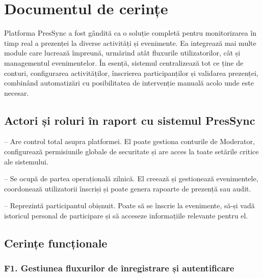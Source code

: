 \documentclass[a4paper,12pt,oneside]{report}
\begin{document}
\section{Documentul de cerințe}

Platforma PresSync a fost gândită ca o soluție completă pentru monitorizarea în timp real a prezenței la diverse activități și evenimente. Ea integrează mai multe module care lucrează împreună, urmărind atât fluxurile utilizatorilor, cât și managementul evenimentelor. În esență, sistemul centralizează tot ce ține de conturi, configurarea activităților, înscrierea participanților și validarea prezenței, combinând automatizări cu posibilitatea de intervenție manuală acolo unde este necesar.

\subsection{Actori și roluri în raport cu sistemul PresSync}

\begin{description}[leftmargin=1.5cm, style=nextline]
    \item[Admin] – Are control total asupra platformei. El poate gestiona conturile de Moderator, configurează permisiunile globale de securitate și are acces la toate setările critice ale sistemului.
    
    \item[Moderator] – Se ocupă de partea operațională zilnică. El creează și gestionează evenimentele, coordonează utilizatorii înscriși și poate genera rapoarte de prezență sau audit.
    
    \item[User] – Reprezintă participantul obișnuit. Poate să se înscrie la evenimente, să-și vadă istoricul personal de participare și să acceseze informațiile relevante pentru el.
\end{description}

\subsection{Cerințe funcționale}

\subsubsection*{F1. Gestiunea fluxurilor de înregistrare și autentificare}
\end{document}
